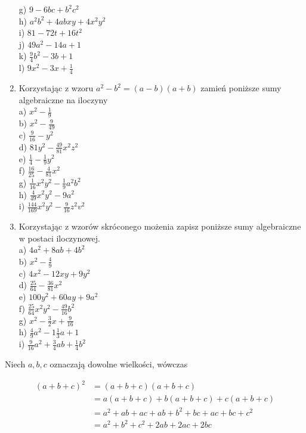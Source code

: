 \documentclass[10pt]{article}
\begin{document}
\begin{enumerate}
g) \(9-6 b c+b^{2} c^{2}\)\\
h) \(a^{2} b^{2}+4 a b x y+4 x^{2} y^{2}\)\\
i) \(81-72 t+16 t^{2}\)\\
j) \(49 a^{2}-14 a+1\)\\
k) \(\frac{9}{4} b^{2}-3 b+1\)\\
l) \(9 x^{2}-3 x+\frac{1}{4}\)
  \item Korzystając z wzoru \(a^{2}-b^{2}=(a-b)(a+b)\) zamień poniższe sumy algebraiczne na iloczyny\\
a) \(x^{2}-\frac{1}{9}\)\\
b) \(x^{2}-\frac{9}{49}\)\\
c) \(\frac{9}{16}-y^{2}\)\\
d) \(81 y^{2}-\frac{49}{81} x^{2} z^{2}\)\\
e) \(\frac{1}{4}-\frac{1}{9} y^{2}\)\\
f) \(\frac{16}{25}-\frac{4}{81} x^{2}\)\\
g) \(\frac{1}{16} x^{2} y^{2}-\frac{1}{9} a^{2} b^{2}\)\\
h) \(\frac{4}{49} x^{2} y^{2}-9 a^{2}\)\\
i) \(\frac{144}{169} x^{2} y^{2}-\frac{9}{16} z^{2} v^{2}\)
  \item Korzystając z wzorów skróconego możenia zapisz poniższe sumy algebraiczne w postaci iloczynowej.\\
a) \(4 a^{2}+8 a b+4 b^{2}\)\\
b) \(x^{2}-\frac{4}{9}\)\\
c) \(4 x^{2}-12 x y+9 y^{2}\)\\
d) \(\frac{25}{64}-\frac{36}{81} x^{2}\)\\
e) \(100 y^{2}+60 a y+9 a^{2}\)\\
f) \(\frac{25}{64} x^{2} y^{2}-\frac{49}{16} b^{2}\)\\
g) \(x^{2}-\frac{3}{2} x+\frac{9}{16}\)\\
h) \(\frac{4}{9} a^{2}-1 \frac{1}{3} a+1\)\\
i) \(\frac{9}{16} a^{2}+\frac{3}{4} a b+\frac{1}{4} b^{2}\)
\end{enumerate}

Niech \(a, b, c\) oznaczają dowolne wielkości, wówczas

\[
\begin{aligned}
(a+b+c)^{2} & =(a+b+c)(a+b+c) \\
& =a(a+b+c)+b(a+b+c)+c(a+b+c) \\
& =a^{2}+a b+a c+a b+b^{2}+b c+a c+b c+c^{2} \\
& =a^{2}+b^{2}+c^{2}+2 a b+2 a c+2 b c
\end{aligned}
\]
\end{document}
